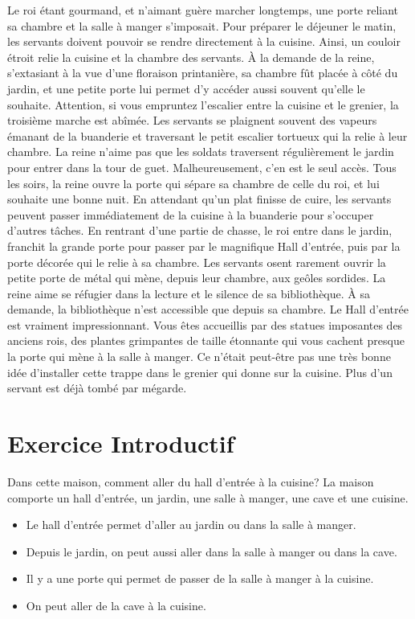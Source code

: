 \documentclass[dvipsnames]{article}
\begin{document}
Le roi étant gourmand, et n'aimant guère marcher longtemps, une porte reliant sa chambre et la salle à manger s'imposait.
Pour préparer le déjeuner le matin, les servants doivent pouvoir se rendre directement à la cuisine. Ainsi, un couloir étroit relie la cuisine et la chambre des servants.
À la demande de la reine, s'extasiant à la vue d'une floraison printanière, sa chambre fût placée à côté du jardin, et une petite porte lui permet d'y accéder aussi souvent qu'elle le souhaite.
Attention, si vous empruntez l'escalier entre la cuisine et le grenier, la troisième marche est abîmée.
Les servants se plaignent souvent des vapeurs émanant de la buanderie et traversant le petit escalier tortueux qui la relie à leur chambre.
La reine n'aime pas que les soldats traversent régulièrement le jardin pour entrer dans la tour de guet. Malheureusement, c'en est le seul accès.
Tous les soirs, la reine ouvre la porte qui sépare sa chambre de celle du roi, et lui souhaite une bonne nuit.
En attendant qu'un plat finisse de cuire, les servants peuvent passer immédiatement de la cuisine à la buanderie pour s'occuper d'autres tâches.
En rentrant d'une partie de chasse, le roi entre dans le jardin, franchit la grande porte pour passer par le magnifique Hall d'entrée, puis par la porte décorée qui le relie à sa chambre.
Les servants osent rarement ouvrir la petite porte de métal qui mène, depuis leur chambre, aux geôles sordides.
La reine aime se réfugier dans la lecture et le silence de sa bibliothèque. À sa demande, la bibliothèque n'est accessible que depuis sa chambre.
Le Hall d'entrée est vraiment impressionnant. Vous êtes accueillis par des statues imposantes des anciens rois, des plantes grimpantes de taille étonnante qui vous cachent presque la porte qui mène à la salle à manger.
Ce n'était peut-être pas une très bonne idée d'installer cette trappe dans le grenier qui donne sur la cuisine. Plus d'un servant est déjà tombé par mégarde.

\newpage
\section{Exercice Introductif}
Dans cette maison, comment aller du hall d'entrée à la cuisine?
La maison comporte un hall d'entrée, un jardin, une salle à manger, une cave et une cuisine.

\begin{itemize}
\item Le hall d'entrée permet d'aller au jardin ou dans la salle à manger.
\item Depuis le jardin, on peut aussi aller dans la salle à manger ou dans la cave.
\item Il y a une porte qui permet de passer de la salle à manger à la cuisine.
\item On peut aller de la cave à la cuisine.
\end{itemize}
\end{document}
